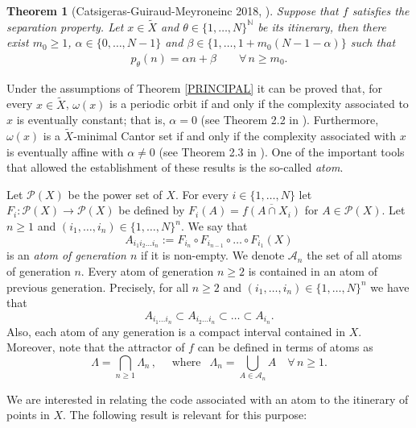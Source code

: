 \documentclass[a4paper]{article}
\newtheorem{theorem}{Theorem}[section]
\begin{document}
\begin{theorem}[Catsigeras-Guiraud-Meyroneinc 2018,  \cite{CGM18}]\label{COMPLEXITY.THEOREM}
    Suppose that $f$ satisfies the se\-pa\-ra\-tion property. Let $x\in\widetilde X$ and $\theta\in\{1,\ldots,N\}^{\mathbb N}$ be its itinerary, then there exist $m_0\geq1$, $\alpha\in\{0,\ldots,N-1\}$ and $\beta\in\big\{1,\ldots,1+m_0(N-1-\alpha)\big\}$ such that
    \begin{eqnarray}
        p_\theta(n)=\alpha n+\beta\qquad\forall\,n\geq m_0. \label{EQ.COMPLEXITY}
    \end{eqnarray}
\end{theorem}
Under the assumptions of Theorem \ref{PRINCIPAL} it can be proved that, for every $x\in\widetilde X$, $\omega(x)$ is a periodic orbit if and only if the complexity associated to $x$ is eventually constant; that is, $\alpha=0$ (see Theorem 2.2 in \cite{CCG21}). Furthermore, $\omega(x)$ is a $\widetilde X$-minimal Cantor set if and only if the complexity associated with $x$ is eventually affine with $\alpha \neq 0$ (see Theorem 2.3 in \cite{CCG21}). One of the important tools that allowed the establishment of these results is the so-called {\em atom}.

Let $\mathcal P(X)$ be the power set of $X$. For every $i\in\{1,\ldots,N\}$ let $F_i:\mathcal P(X)\to\mathcal P(X)$ be defined by $F_i(A)=\overline{f(A\cap X_i)}$ for $A\in\mathcal P(X)$. Let $n\geq1$ and $(i_1,\ldots,i_n)\in\{1,\ldots,N\}^n$. We say that
    \[
        A_{i_1i_2\ldots i_n}:= F_{i_n}\circ F_{i_{n-1}}\circ\ldots\circ F_{i_1}(X)
    \]
is an {\em atom of generation $n$} if it is non-empty. We denote $\mathcal A_n$ the set of all atoms of generation $n$. Every atom of generation $n\geq2$ is contained in an atom of previous generation. Precisely, for all $n\geq2$ and $(i_1,\ldots,i_n)\in\{1,\ldots,N\}^n$ we have that 
\[
    A_{i_1\ldots i_n}\subset A_{i_2\ldots i_n}\subset\ldots\subset A_{i_n}.
\]
Also, each atom of any generation is a compact interval contained in $X$. Moreover, note that the attractor of $f$ can be defined in terms of atoms as
\begin{equation}
    \Lambda=\bigcap_{n\geq1}\Lambda_n\,,\quad \text{ where }\;\, \Lambda_n=\bigcup_{A\in\mathcal A_n}A\quad\forall\,n\geq1.\label{ATTRACTOR.ATOMS}
\end{equation}

We are interested in relating the code associated with an atom to the itinerary of points in {$X$}. The following result is relevant for this purpose:
\end{document}
